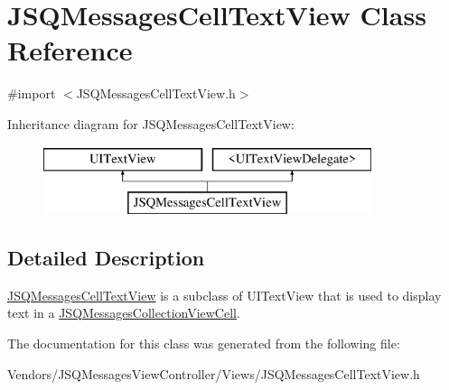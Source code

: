 \hypertarget{interface_j_s_q_messages_cell_text_view}{}\section{J\+S\+Q\+Messages\+Cell\+Text\+View Class Reference}
\label{interface_j_s_q_messages_cell_text_view}


{\ttfamily \#import $<$J\+S\+Q\+Messages\+Cell\+Text\+View.\+h$>$}

Inheritance diagram for J\+S\+Q\+Messages\+Cell\+Text\+View\+:\begin{figure}[H]
\begin{center}
\leavevmode
\includegraphics[height=2.000000cm]{interface_j_s_q_messages_cell_text_view}
\end{center}
\end{figure}


\subsection{Detailed Description}
{\ttfamily \hyperlink{interface_j_s_q_messages_cell_text_view}{J\+S\+Q\+Messages\+Cell\+Text\+View}} is a subclass of {\ttfamily U\+I\+Text\+View} that is used to display text in a {\ttfamily \hyperlink{interface_j_s_q_messages_collection_view_cell}{J\+S\+Q\+Messages\+Collection\+View\+Cell}}. 

The documentation for this class was generated from the following file\+:\begin{DoxyCompactItemize}
\item 
Vendors/\+J\+S\+Q\+Messages\+View\+Controller/\+Views/J\+S\+Q\+Messages\+Cell\+Text\+View.\+h\end{DoxyCompactItemize}
